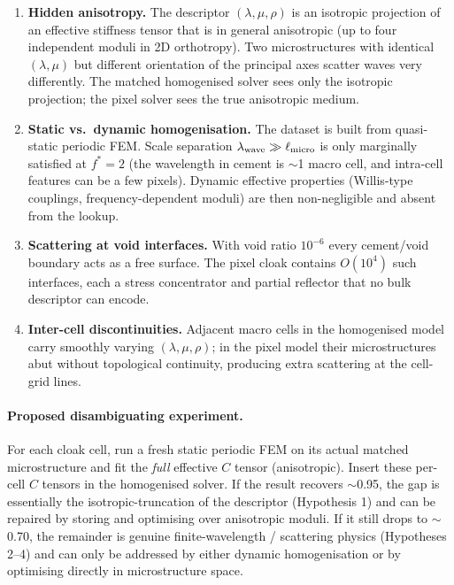 \documentclass[11pt,a4paper]{article}
\begin{document}
\begin{enumerate}
  \item \textbf{Hidden anisotropy.} The descriptor $(\lambda,\mu,\rho)$ is
        an isotropic projection of an effective stiffness tensor that is
        in general anisotropic (up to four independent moduli in 2D
        orthotropy). Two microstructures with identical $(\lambda,\mu)$
        but different orientation of the principal axes scatter waves
        very differently. The matched homogenised solver sees only the
        isotropic projection; the pixel solver sees the true anisotropic
        medium.
  \item \textbf{Static vs.\ dynamic homogenisation.} The dataset is built
        from quasi-static periodic FEM. Scale separation
        $\lambda_{\rm wave}\gg\ell_{\rm micro}$ is only marginally
        satisfied at $f^{*}=2$ (the wavelength in cement is $\sim$1
        macro cell, and intra-cell features can be a few pixels).
        Dynamic effective properties (Willis-type couplings,
        frequency-dependent moduli) are then non-negligible and absent
        from the lookup.
  \item \textbf{Scattering at void interfaces.} With void ratio $10^{-6}$
        every cement/void boundary acts as a free surface. The pixel
        cloak contains $O(10^{4})$ such interfaces, each a stress
        concentrator and partial reflector that no bulk descriptor can
        encode.
  \item \textbf{Inter-cell discontinuities.} Adjacent macro cells in the
        homogenised model carry smoothly varying $(\lambda,\mu,\rho)$;
        in the pixel model their microstructures abut without
        topological continuity, producing extra scattering at the
        cell-grid lines.
\end{enumerate}

\paragraph{Proposed disambiguating experiment.}
For each cloak cell, run a fresh static periodic FEM on its actual matched
microstructure and fit the \emph{full} effective $C$ tensor (anisotropic).
Insert these per-cell $C$ tensors in the homogenised solver. If the result
recovers $\sim$0.95, the gap is essentially the isotropic-truncation of
the descriptor (Hypothesis 1) and can be repaired by storing and
optimising over anisotropic moduli. If it still drops to $\sim$0.70, the
remainder is genuine finite-wavelength / scattering physics
(Hypotheses 2--4) and can only be addressed by either dynamic
homogenisation or by optimising directly in microstructure space.
\end{document}
